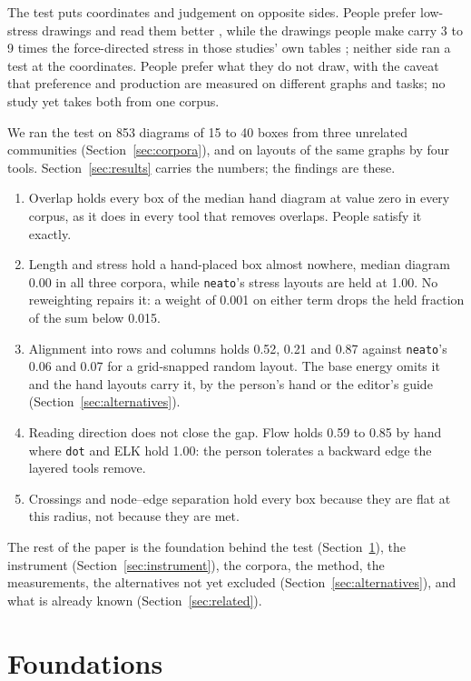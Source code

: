 \documentclass[a4paper,UKenglish]{gd-lipics-v3}
\begin{document}
The test puts coordinates and judgement on opposite sides. People prefer low-stress
drawings and read them better \cite{mooney25, dwyer09}, while the drawings people make
carry 3 to 9 times the force-directed stress in those studies' own tables \cite{dwyer09,
vanham08}; neither side ran a test at the coordinates. People prefer what they do not
draw, with the caveat that preference and production are measured on different graphs
and tasks; no study yet takes both from one corpus.

We ran the test on 853 diagrams of 15 to 40 boxes from three unrelated communities
(Section~\ref{sec:corpora}), and on layouts of the same graphs by four tools.
Section~\ref{sec:results} carries the numbers;
the findings are these.

\begin{enumerate}\itemsep2pt
\item Overlap holds every box of the median hand diagram at value zero in every corpus,
  as it does in every tool that removes overlaps. People satisfy it exactly.
\item Length and stress hold a hand-placed box almost nowhere, median diagram 0.00 in
  all three corpora, while \texttt{neato}'s stress layouts are held at 1.00. No reweighting repairs it: a weight of
  0.001 on either term drops the held fraction of the sum below 0.015.
\item Alignment into rows and columns holds 0.52, 0.21 and 0.87 against \texttt{neato}'s
  0.06 and 0.07 for a grid-snapped random layout. The base energy omits it and the hand
  layouts carry it, by the person's hand or the editor's guide
  (Section~\ref{sec:alternatives}).
\item Reading direction does not close the gap. Flow holds 0.59 to 0.85 by hand where
  \texttt{dot} and ELK hold 1.00: the person tolerates a backward edge the layered tools
  remove.
\item Crossings and node--edge separation hold every box because they are flat at this
  radius, not because they are met.
\end{enumerate}

The rest of the paper is the foundation behind the test (Section~\ref{sec:foundations}),
the instrument (Section~\ref{sec:instrument}), the corpora, the method, the measurements,
the alternatives not yet excluded (Section~\ref{sec:alternatives}), and what is already
known (Section~\ref{sec:related}).

\section{Foundations}\label{sec:foundations}
\end{document}

